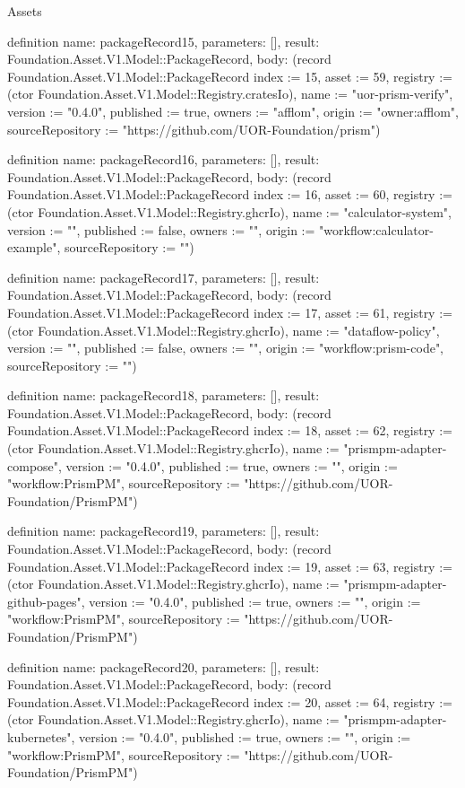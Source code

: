 \begin{lexlean}{Assets}
\begin{semanticmodule}
definition{
  name: packageRecord15,
  parameters: [],
  result: Foundation.Asset.V1.Model::PackageRecord,
  body: (record Foundation.Asset.V1.Model::PackageRecord {index := 15, asset := 59, registry := (ctor Foundation.Asset.V1.Model::Registry.cratesIo), name := "uor-prism-verify", version := "0.4.0", published := true, owners := "afflom", origin := "owner:afflom", sourceRepository := "https://github.com/UOR-Foundation/prism"})
}

definition{
  name: packageRecord16,
  parameters: [],
  result: Foundation.Asset.V1.Model::PackageRecord,
  body: (record Foundation.Asset.V1.Model::PackageRecord {index := 16, asset := 60, registry := (ctor Foundation.Asset.V1.Model::Registry.ghcrIo), name := "calculator-system", version := "", published := false, owners := "", origin := "workflow:calculator-example", sourceRepository := ""})
}

definition{
  name: packageRecord17,
  parameters: [],
  result: Foundation.Asset.V1.Model::PackageRecord,
  body: (record Foundation.Asset.V1.Model::PackageRecord {index := 17, asset := 61, registry := (ctor Foundation.Asset.V1.Model::Registry.ghcrIo), name := "dataflow-policy", version := "", published := false, owners := "", origin := "workflow:prism-code", sourceRepository := ""})
}

definition{
  name: packageRecord18,
  parameters: [],
  result: Foundation.Asset.V1.Model::PackageRecord,
  body: (record Foundation.Asset.V1.Model::PackageRecord {index := 18, asset := 62, registry := (ctor Foundation.Asset.V1.Model::Registry.ghcrIo), name := "prismpm-adapter-compose", version := "0.4.0", published := true, owners := "", origin := "workflow:PrismPM", sourceRepository := "https://github.com/UOR-Foundation/PrismPM"})
}

definition{
  name: packageRecord19,
  parameters: [],
  result: Foundation.Asset.V1.Model::PackageRecord,
  body: (record Foundation.Asset.V1.Model::PackageRecord {index := 19, asset := 63, registry := (ctor Foundation.Asset.V1.Model::Registry.ghcrIo), name := "prismpm-adapter-github-pages", version := "0.4.0", published := true, owners := "", origin := "workflow:PrismPM", sourceRepository := "https://github.com/UOR-Foundation/PrismPM"})
}

definition{
  name: packageRecord20,
  parameters: [],
  result: Foundation.Asset.V1.Model::PackageRecord,
  body: (record Foundation.Asset.V1.Model::PackageRecord {index := 20, asset := 64, registry := (ctor Foundation.Asset.V1.Model::Registry.ghcrIo), name := "prismpm-adapter-kubernetes", version := "0.4.0", published := true, owners := "", origin := "workflow:PrismPM", sourceRepository := "https://github.com/UOR-Foundation/PrismPM"})
}


\end{semanticmodule}
\end{lexlean}
